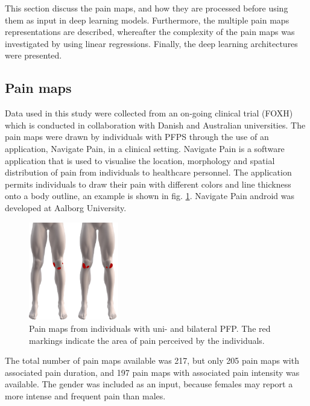 This section discuss the pain maps, and how they are processed before using them as input in deep learning models. Furthermore, the multiple pain maps representations are described, whereafter the complexity of the pain maps was investigated by using linear regressions. Finally, the deep learning architectures were presented.

\subsection*{\textbf{Pain maps}}
Data used in this study were collected from an on-going clinical trial (FOXH) which is conducted in collaboration with Danish and Australian universities. The pain maps were drawn by individuals with PFPS through the use of an application, Navigate Pain, in a clinical setting. \newline
\noindent
Navigate Pain is a software application that is used to visualise the location, morphology and spatial distribution of pain from individuals to healthcare personnel. The application permits individuals to draw their pain with different colors and line thickness onto a body outline, an example is shown in fig. \ref{fig:twoPainmaps}. Navigate Pain android was developed at Aalborg University.\citep{Solutions2015}

\begin{figure}[H]
\centering
\includegraphics[width=0.35\textwidth]{Figures/twoPainmaps}
\caption{Pain maps from individuals with uni- and bilateral PFP. The red markings indicate the area of pain perceived by the individuals.}
\label{fig:twoPainmaps}
\end{figure}

\noindent
The total number of pain maps available was 217, but only 205 pain maps with associated pain duration, and 197 pain maps with associated pain intensity was available. The gender was included as an input, because females may report a more intense and frequent pain than males. 


